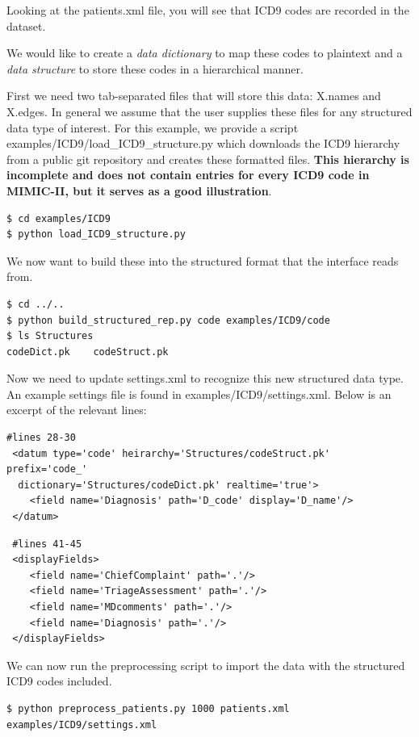 \documentclass[12pt]{article}
\begin{document}
Looking at the patients.xml file, you will see that ICD9 codes are recorded in the dataset.

We would like to create a {\em data dictionary} to map these codes to plaintext and a {\em data structure} to store these codes in a hierarchical manner.

First we need two tab-separated files that will store this data: X.names and X.edges. 
In general we assume that the user supplies these files for any structured data type of interest.
For this example, we provide a script examples/ICD9/load\_ICD9\_structure.py which downloads the ICD9 hierarchy from a public git repository and creates these formatted files. {\bf This hierarchy is incomplete and does not contain entries for every ICD9 code in MIMIC-II, but it serves as a good illustration}.

\begin{verbatim}
$ cd examples/ICD9
$ python load_ICD9_structure.py
\end{verbatim}

We now want to build these into the structured format that the interface reads from.
\begin{verbatim}
$ cd ../..
$ python build_structured_rep.py code examples/ICD9/code
$ ls Structures
codeDict.pk    codeStruct.pk
\end{verbatim}

Now we need to update settings.xml to recognize this new structured data type. An example settings file is found in examples/ICD9/settings.xml. Below is an excerpt of the relevant lines:

\begin{verbatim}
#lines 28-30
 <datum type='code' heirarchy='Structures/codeStruct.pk' prefix='code_'
  dictionary='Structures/codeDict.pk' realtime='true'>
    <field name='Diagnosis' path='D_code' display='D_name'/>
 </datum>
 \end{verbatim}

 \begin{verbatim}
 #lines 41-45
 <displayFields>
    <field name='ChiefComplaint' path='.'/>
    <field name='TriageAssessment' path='.'/>
    <field name='MDcomments' path='.'/>
    <field name='Diagnosis' path='.'/>
 </displayFields>
\end{verbatim}

We can now run the preprocessing script to import the data with the structured ICD9 codes included.

\begin{verbatim}
$ python preprocess_patients.py 1000 patients.xml examples/ICD9/settings.xml
\end{verbatim}
\end{document}
